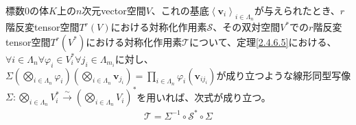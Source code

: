 \documentclass[dvipdfmx]{jsarticle}
\begin{document}
\begin{thm}\label{2.4.8.17}
標数$0$の体$K$上の$n$次元vector空間$V$、これの基底$\left\langle \mathbf{v}_{i} \right\rangle_{i \in \varLambda_{n}}$が与えられたとき、$r$階反変tensor空間$T^{r}(V)$における対称化作用素$\mathcal{S}$、その双対空間$V^{*}$での$r$階反変tensor空間$T^{r}(V^{*})$における対称化作用素$\mathcal{T}$について、定理\ref{2.4.6.5}における、$\forall i \in \varLambda_{n}\forall\varphi_{i} \in V_{i}^{*}\forall j_{i} \in \varLambda_{m_{i}}$に対し、$\varSigma\left( \bigotimes_{i \in \varLambda_{n}} \varphi_{i} \right)\left( \bigotimes_{i \in \varLambda_{n}} \mathbf{v}_{j_{i}} \right) = \prod_{i \in \varLambda_{n}} {\varphi_{i}\left( \mathbf{v}_{ij_{i}} \right)}$が成り立つような線形同型写像$\varSigma:\bigotimes_{i \in \varLambda_{n}} V_{i}^{*}\overset{\sim}{\rightarrow}\left( \bigotimes_{i \in \varLambda_{n}} V_{i} \right)^{*}$を用いれば、次式が成り立つ。
\begin{align*}
\mathcal{T} =\varSigma^{- 1} \circ \mathcal{S}^{*} \circ \varSigma
\end{align*}
\end{thm}
\end{document}
